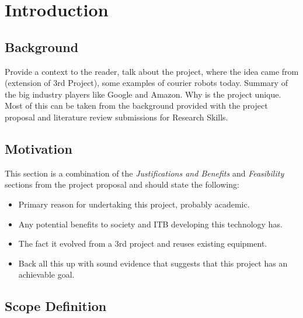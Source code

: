 \chapter{Introduction}


\section{Background}

\noindent
Provide a context to the reader, talk about the project, where the idea came from (extension of 3rd Project), some examples of courier robots today. Summary of the big industry players like Google and Amazon. Why is the project unique. Most of this can be taken from the background provided with the project proposal and literature review submissions for Research Skills.


\section{Motivation}

\noindent
This section is a combination of the \textit{Justifications and Benefits} and \textit{Feasibility} sections from the project proposal and should state the following:

\begin{itemize}
\item Primary reason for undertaking this project, probably academic.
\item Any potential benefits to society and ITB developing this technology has.
\item The fact it evolved from a 3rd project and reuses existing equipment.
\item Back all this up with sound evidence that suggests that this project has an achievable goal.
\end{itemize} 


\section{Scope Definition}

